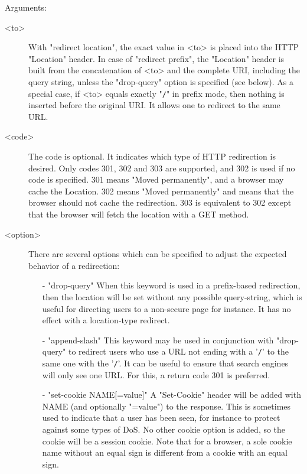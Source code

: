   Arguments:
  \begin{description}
  \item[<to>] With "redirect location", the exact value in <to> is placed into
              the HTTP "Location" header. In case of "redirect prefix", the
              "Location" header is built from the concatenation of <to> and the
              complete URI, including the query string, unless the "drop-query"
              option is specified (see below). As a special case, if <to>
              equals exactly "\verb|/|" in prefix mode, then nothing is inserted
              before the original URI. It allows one to redirect to the same
              URL.

  \item[<code>] The code is optional. It indicates which type of HTTP redirection
              is desired. Only codes 301, 302 and 303 are supported, and 302 is
              used if no code is specified. 301 means "Moved permanently", and
              a browser may cache the Location. 302 means "Moved permanently"
              and means that the browser should not cache the redirection. 303
              is equivalent to 302 except that the browser will fetch the
              location with a GET method.

  \item[<option>] There are several options which can be specified to adjust the
              expected behavior of a redirection:
      \begin{itemize}
      \item[-] "drop-query"
        When this keyword is used in a prefix-based redirection, then the
        location will be set without any possible query-string, which is useful
        for directing users to a non-secure page for instance. It has no effect
        with a location-type redirect.

      \item[-] "append-slash"
        This keyword may be used in conjunction with "drop-query" to redirect
        users who use a URL not ending with a '\verb|/|' to the same one with the '\verb|/|'.
        It can be useful to ensure that search engines will only see one URL.
        For this, a return code 301 is preferred.

      \item[-] "set-cookie NAME[=value]"
        A "Set-Cookie" header will be added with NAME (and optionally "=value")
        to the response. This is sometimes used to indicate that a user has
        been seen, for instance to protect against some types of DoS. No other
        cookie option is added, so the cookie will be a session cookie. Note
        that for a browser, a sole cookie name without an equal sign is
        different from a cookie with an equal sign.


\end{itemize}
\end{description}
